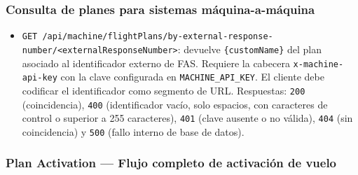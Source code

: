 \documentclass[12pt,a4paper]{article}
\begin{document}
\subsubsection*{Consulta de planes para sistemas máquina-a-máquina}
\begin{itemize}
  \item \texttt{GET /api/machine/flightPlans/by-external-response-number/<externalResponseNumber>}: devuelve \texttt{\{customName\}} del plan asociado al identificador externo de FAS. Requiere la cabecera \texttt{x-machine-api-key} con la clave configurada en \texttt{MACHINE\_API\_KEY}. El cliente debe codificar el identificador como segmento de URL. Respuestas: \texttt{200} (coincidencia), \texttt{400} (identificador vacío, solo espacios, con caracteres de control o superior a 255 caracteres), \texttt{401} (clave ausente o no válida), \texttt{404} (sin coincidencia) y \texttt{500} (fallo interno de base de datos).
\end{itemize}

\subsubsection*{Plan Activation — Flujo completo de activación de vuelo}
\end{document}
